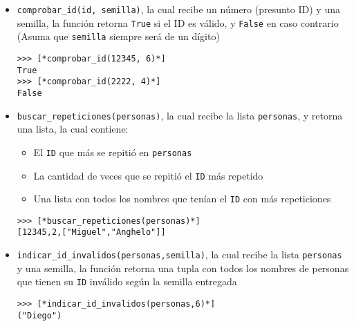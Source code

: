 \begin{itemize}
    \item \texttt{comprobar\_id(id, semilla)}, la cual recibe un número (presunto ID) y una semilla, la función retorna \texttt{True} si el ID es válido, y \texttt{False} en caso contrario (Asuma que \texttt{semilla} siempre será de un dígito)
\begin{lstlisting}[style=consola]
>>> [*comprobar_id(12345, 6)*]
True
>>> [*comprobar_id(2222, 4)*]
False
\end{lstlisting}
    \item \texttt{buscar\_repeticiones(personas)}, la cual recibe la lista \texttt{personas}, y retorna una lista, la cual contiene: \begin{itemize}
        \item El \texttt{ID} que más se repitió en \texttt{personas}
        \item La cantidad de veces que se repitió el \texttt{ID} más repetido
        \item Una lista con todos los nombres que tenían el \texttt{ID} con más repeticiones
    \end{itemize}
\begin{lstlisting}[style=consola]
>>> [*buscar_repeticiones(personas)*]
[12345,2,["Miguel","Anghelo"]]
\end{lstlisting}
    \item \texttt{indicar\_id\_invalidos(personas,semilla)}, la cual recibe la lista \texttt{personas} y una semilla, la función retorna una tupla con todos los nombres de personas que tienen su \texttt{ID} inválido según la semilla entregada
\begin{lstlisting}[style=consola]
>>> [*indicar_id_invalidos(personas,6)*]
("Diego")
\end{lstlisting}
\end{itemize}
